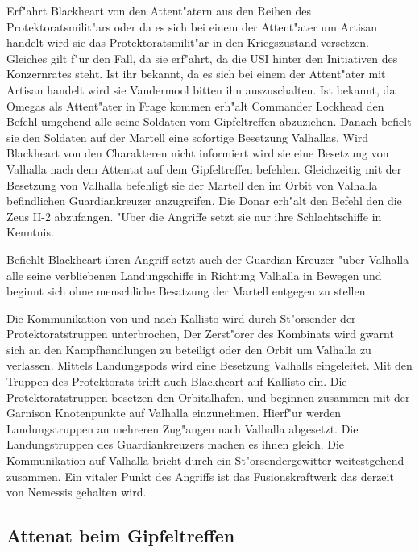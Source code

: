 Erf"ahrt Blackheart von den Attent"atern aus den Reihen des Protektoratsmilit"ars oder da\3 es sich bei einem der Attent"ater um Artisan handelt wird sie das Protektoratsmilit"ar in den Kriegszustand versetzen. Gleiches gilt f"ur den Fall, da\3 sie erf"ahrt, da\3 die USI hinter den Initiativen des Konzernrates steht. Ist ihr bekannt, da\3 es sich bei einem der Attent"ater mit Artisan handelt wird sie Vandermool bitten ihn auszuschalten. Ist bekannt, da\3 Omegas als Attent"ater in Frage kommen erh"alt Commander Lockhead den Befehl umgehend alle seine Soldaten vom Gipfeltreffen abzuziehen. Danach befielt sie den Soldaten auf der Martell eine sofortige Besetzung Valhallas. Wird Blackheart von den Charakteren nicht informiert wird sie eine Besetzung von Valhalla nach dem Attentat auf dem Gipfeltreffen befehlen. Gleichzeitig mit der Besetzung von Valhalla befehligt sie der Martell den im Orbit von Valhalla befindlichen Guardiankreuzer anzugreifen. Die Donar erh"alt den Befehl den die Zeus II-2 abzufangen. "Uber die Angriffe setzt sie nur ihre Schlachtschiffe in Kenntnis.

Befiehlt Blackheart ihren Angriff setzt auch der Guardian Kreuzer "uber Valhalla alle seine verbliebenen Landungschiffe in Richtung Valhalla in Bewegen und beginnt sich ohne menschliche Besatzung der Martell entgegen zu stellen.

Die Kommunikation von und nach Kallisto wird durch St"orsender der Protektoratstruppen unterbrochen, Der Zerst"orer des Kombinats wird gwarnt sich an den Kampfhandlungen zu beteiligt oder den Orbit um Valhalla zu verlassen. Mittels Landungspods wird eine Besetzung Valhalls eingeleitet. Mit den Truppen des Protektorats trifft auch Blackheart auf Kallisto ein. Die Protektoratstruppen besetzen den Orbitalhafen, und beginnen zusammen mit der Garnison  Knotenpunkte auf Valhalla einzunehmen. Hierf"ur werden Landungstruppen an mehreren Zug"angen nach Valhalla abgesetzt. Die Landungstruppen des Guardiankreuzers machen es ihnen gleich. Die Kommunikation auf Valhalla bricht durch ein St"orsendergewitter weitestgehend zusammen. Ein vitaler Punkt des Angriffs ist das Fusionskraftwerk das derzeit von Nemessis gehalten wird.

\subsection{Attenat beim Gipfeltreffen}

